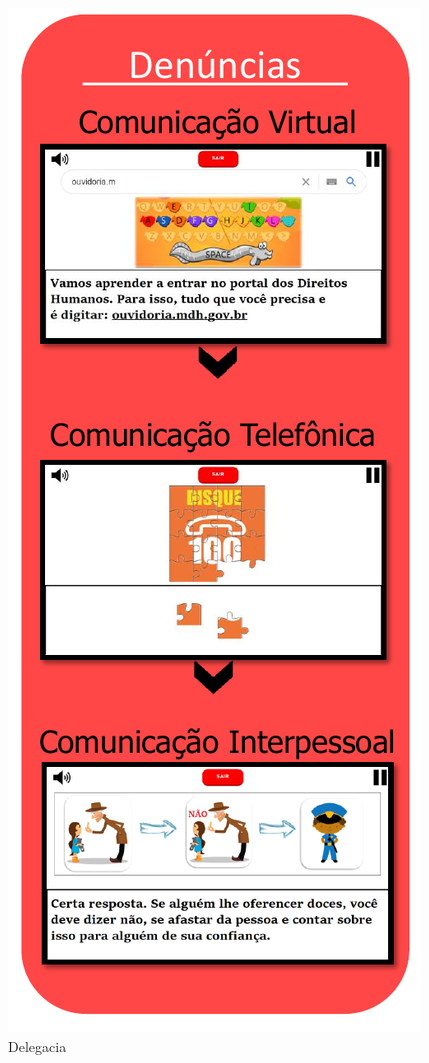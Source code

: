 \begin{figure}%
  \vspace{-20pt}
  \caption{\label{fig:DelegaciaDP}Delegacia}
  \includegraphics[width=\linewidth]{./Figuras/Delegacia.pdf}
  \vspace{-1.0cm}
\end{figure}


